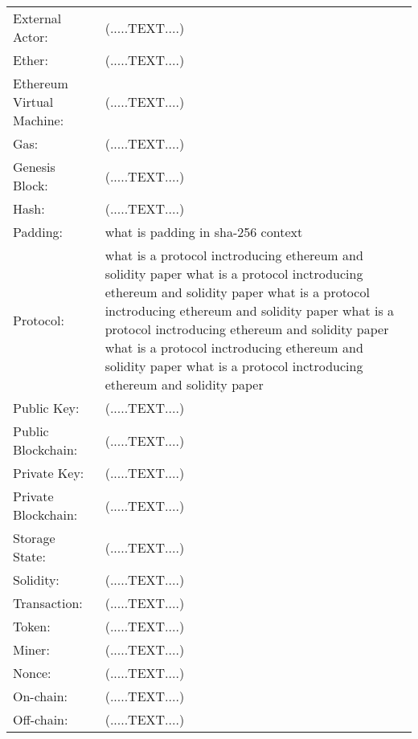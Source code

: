 \begin{center}
	\begin{tabular}{ p{4cm} p{8cm} } 
		External Actor: & (.....TEXT....) \\
		Ether: & (.....TEXT....) \\
		Ethereum Virtual Machine: & (.....TEXT....) \\
		Gas: & (.....TEXT....) \\
		Genesis Block: & (.....TEXT....) \\
		Hash: & (.....TEXT....) \\
		Padding: & what is padding in sha-256 context \\
		Protocol: & what is a protocol inctroducing ethereum and solidity paper what is a protocol inctroducing ethereum and solidity paper what is a protocol inctroducing ethereum and solidity paper what is a protocol inctroducing ethereum and solidity paper what is a protocol inctroducing ethereum and solidity paper what is a protocol inctroducing ethereum and solidity paper \\
		Public Key: & (.....TEXT....) \\
		Public Blockchain: & (.....TEXT....) \\
		Private Key: & (.....TEXT....) \\
		Private Blockchain: & (.....TEXT....) \\
		Storage State: & (.....TEXT....) \\
		Solidity: & (.....TEXT....) \\
		Transaction:  & (.....TEXT....) \\
		Token: & (.....TEXT....) \\
		Miner: & (.....TEXT....) \\
		Nonce: & (.....TEXT....) \\
		On-chain: & (.....TEXT....) \\
		Off-chain: & (.....TEXT....) \\
	\end{tabular}
\end{center}








